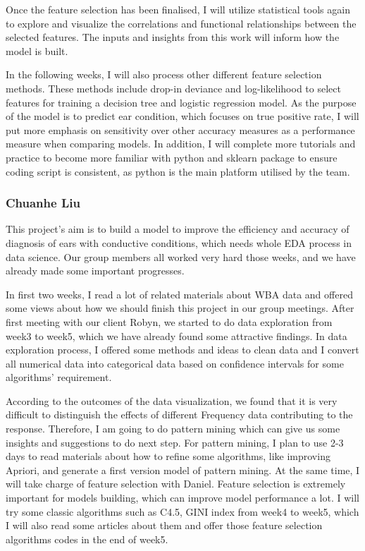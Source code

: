 \documentclass[11pt,a4paper]{article}
\begin{document}
 

Once the feature selection has been finalised, I will utilize statistical tools again to explore and visualize the correlations and functional relationships between the selected features. The inputs and insights from this work will inform how the model is built. 

 

In the following weeks, I will also process other different feature selection methods. These methods include drop-in deviance and log-likelihood to select features for training a decision tree and logistic regression model. As the purpose of the model is to predict ear condition, which focuses on true positive rate, I will put more emphasis on sensitivity over other accuracy measures as a performance measure when comparing models. In addition, I will complete more tutorials and practice to become more familiar with python and sklearn package to ensure coding script is consistent, as python is the main platform utilised by the team. 
\subsubsection*{Chuanhe Liu}
This project’s aim is to build a model to improve the efficiency and accuracy of diagnosis of ears with conductive conditions, which needs whole EDA process in data science. Our group members all worked very hard those weeks, and we have already made some important progresses. 

 

In first two weeks, I read a lot of related materials about WBA data and offered some views about how we should finish this project in our group meetings. After first meeting with our client Robyn, we started to do data exploration from week3 to week5, which we have already found some attractive findings. In data exploration process, I offered some methods and ideas to clean data and I convert all numerical data into categorical data based on confidence intervals for some algorithms’ requirement. 

 

According to the outcomes of the data visualization, we found that it is very difficult to distinguish the effects of different Frequency data contributing to the response. Therefore, I am going to do pattern mining which can give us some insights and suggestions to do next step. For pattern mining, I plan to use 2-3 days to read materials about how to refine some algorithms, like improving Apriori, and generate a first version model of pattern mining. At the same time, I will take charge of feature selection with Daniel. Feature selection is extremely important for models building, which can improve model performance a lot. I will try some classic algorithms such as C4.5, GINI index from week4 to week5, which I will also read some articles about them and offer those feature selection algorithms codes in the end of week5. 
\end{document}
